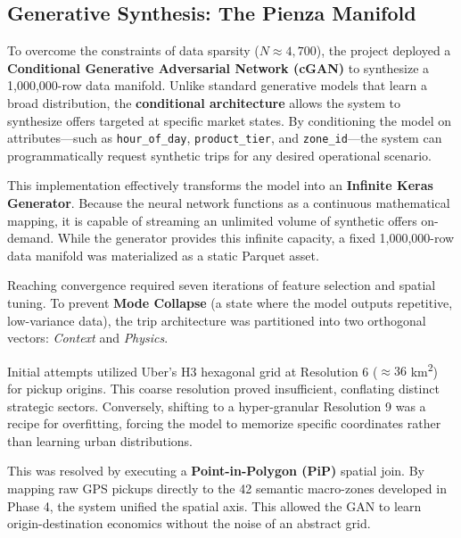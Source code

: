 \subsection{Generative Synthesis: The Pienza Manifold}
To overcome the constraints of data sparsity ($N \approx 4,700$), the project deployed a \textbf{Conditional Generative Adversarial Network (cGAN)} to synthesize a 1,000,000-row data manifold. Unlike standard generative models that learn a broad distribution, the \textbf{conditional architecture} allows the system to synthesize offers targeted at specific market states. By conditioning the model on attributes—such as \texttt{hour\_of\_day}, \texttt{product\_tier}, and \texttt{zone\_id}—the system can programmatically request synthetic trips for any desired operational scenario.

This implementation effectively transforms the model into an \textbf{Infinite Keras Generator}. Because the neural network functions as a continuous mathematical mapping, it is capable of streaming an unlimited volume of synthetic offers on-demand. While the generator provides this infinite capacity, a fixed 1,000,000-row data manifold was materialized as a static Parquet asset. 

Reaching convergence required seven iterations of feature selection and spatial tuning. To prevent \textbf{Mode Collapse} (a state where the model outputs repetitive, low-variance data), the trip architecture was partitioned into two orthogonal vectors: \textit{Context} and \textit{Physics}.

Initial attempts utilized Uber's H3 hexagonal grid at Resolution 6 ($\approx 36$ km\textsuperscript{2}) for pickup origins. This coarse resolution proved insufficient, conflating distinct strategic sectors. Conversely, shifting to a hyper-granular Resolution 9 was a recipe for overfitting, forcing the model to memorize specific coordinates rather than learning urban distributions. 

This was resolved by executing a \textbf{Point-in-Polygon (PiP)} spatial join. By mapping raw GPS pickups directly to the 42 semantic macro-zones developed in Phase 4, the system unified the spatial axis. This allowed the GAN to learn origin-destination economics without the noise of an abstract grid.

